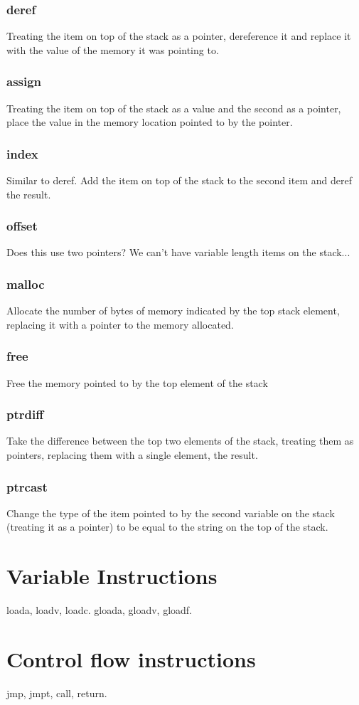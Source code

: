 \subsubsection{deref}
Treating the item on top of the stack as a pointer, dereference it and replace it with the value of the memory it was pointing to.
\subsubsection{assign}
Treating the item on top of the stack as a value and the second as a pointer, place the value in the memory location pointed to by the pointer.
\subsubsection{index}
Similar to deref. Add the item on top of the stack to the second item and deref the result.
\subsubsection{offset}
Does this use two pointers? We can't have variable length items on the stack...
\subsubsection{malloc}
Allocate the number of bytes of memory indicated by the top stack element, replacing it with a pointer to the memory allocated.
\subsubsection{free}
Free the memory pointed to by the top element of the stack
\subsubsection{ptrdiff}
Take the difference between the top two elements of the stack, treating them as pointers, replacing them with a single element, the result.
\subsubsection{ptrcast}
Change the type of the item pointed to by the second variable on the stack (treating it as a pointer) to be equal to the string on the top of the stack.

\section{Variable Instructions}
loada, loadv, loadc.
gloada, gloadv, gloadf.

\section{Control flow instructions}
jmp, jmpt, call, return.